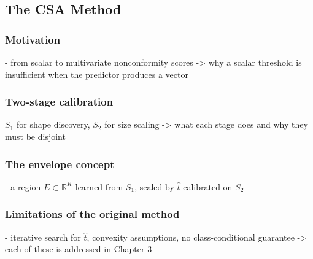 \subsection{The CSA Method}
\label{sec2.3: CSA method}
\subsubsection{Motivation} 
\noindent - from scalar to multivariate nonconformity scores -> why a scalar threshold is insufficient when the predictor produces a vector

\subsubsection{Two-stage calibration} 
\noindent $S_1$ for shape discovery, $S_2$ for size scaling -> what each stage does and why they must be disjoint

\subsubsection{The envelope concept}
\noindent - a region $E \subset \mathbb{R}^K$ learned from $S_1$, scaled by $\hat{t}$ calibrated on $S_2$

\subsubsection{Limitations of the original method}
- iterative search for $\hat{t}$, convexity assumptions, no class-conditional guarantee -> each of these is addressed in Chapter 3